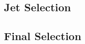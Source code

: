\subsection{Jet Selection}
\subsection{Final Selection}

\begin{comment}
This analysis is searching for a Higgs boson which decays to two W bosons, one of which decays hadronically and the other which decays leptonically.
Therefore the signal region for the search includes one tight lepton, at least 25\gev of \ETslash, and at least two jets.
The vertex, jets, and lepton requirements all meet the object requirements as defined by CMS.
The minimum electron (muon) \pt was set to 30\gev (25\gev) and the minimum jet \pt was set to 25\gev, except for the leading jet, which is required to have a \ptgt{30\gev}.
As the hadronic W decay will have at least two jets, that is the minimum number of jets needed to make it into the signal region, but we do not veto on additional jets which might come from ISR or FSR.
The \ETslash requirement is there because of the neutrino from the leptonic decay of the W, but is set to a value on the higher side to remove as much QCD as possible without cutting out too much signal.
Additionally, a b-tag veto is implemented for two reasons.
The first is because hadronically decaying W only rarely decay to b-jets, but the \ttbar background includes at least two b-jets in its final state.
The second reason is to keep this analysis orthogonal to the VH(H$\rightarrow${bb}) search~\cite{PhysRevD.89.012003}.
Table~\ref{tab:FinalYields} shows the expected event yields in the signal region.

Two main control regions are defined based on the aforementioned signal selection criteria.
The first includes all of the same cuts as the signal region, but only one jets.
This region is used for the normalization of the data-driven QCD sample.
A second control region requires there to be exactly 1 b-jet.
This region is used to check the volunteer signal contribution and the efficacy of the b-tag veto.


\end{comment}
